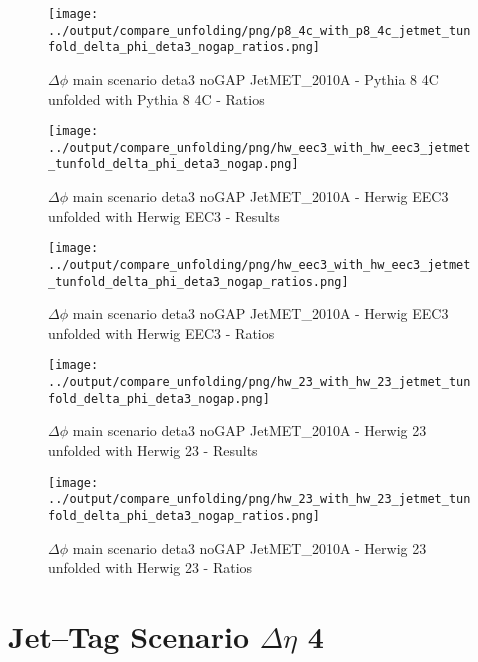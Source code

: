 \documentclass[11pt]{book}
\begin{document}
\begin{figure}[ht]
\centering
\texttt{[image: ../output/compare\_unfolding/png/p8\_4c\_with\_p8\_4c\_jetmet\_tunfold\_delta\_phi\_deta3\_nogap\_ratios.png]}
\caption{$\Delta\phi$ main scenario deta3 noGAP JetMET\_2010A - Pythia 8 4C unfolded with Pythia 8 4C - Ratios}
\label{p8_p8_jetmet_tunfold_delta_phi_deta3_nogap_b}
\end{figure}

\begin{figure}[ht]
\centering
\texttt{[image: ../output/compare\_unfolding/png/hw\_eec3\_with\_hw\_eec3\_jetmet\_tunfold\_delta\_phi\_deta3\_nogap.png]}
\caption{$\Delta\phi$ main scenario deta3 noGAP JetMET\_2010A - Herwig EEC3 unfolded with Herwig EEC3 - Results}
\label{hw_eec3_hw_eec3_jetmet_tunfold_delta_phi_deta3_nogap_a}
\end{figure}

\begin{figure}[ht]
\centering
\texttt{[image: ../output/compare\_unfolding/png/hw\_eec3\_with\_hw\_eec3\_jetmet\_tunfold\_delta\_phi\_deta3\_nogap\_ratios.png]}
\caption{$\Delta\phi$ main scenario deta3 noGAP JetMET\_2010A - Herwig EEC3 unfolded with Herwig EEC3 - Ratios}
\label{hw_eec3_hw_eec3_jetmet_tunfold_delta_phi_deta3_nogap_b}
\end{figure}

\begin{figure}[ht]
\centering
\texttt{[image: ../output/compare\_unfolding/png/hw\_23\_with\_hw\_23\_jetmet\_tunfold\_delta\_phi\_deta3\_nogap.png]}
\caption{$\Delta\phi$ main scenario deta3 noGAP JetMET\_2010A - Herwig 23 unfolded with Herwig 23 - Results}
\label{hw_23_hw_23_jetmet_tunfold_delta_phi_deta3_nogap_a}
\end{figure}

\begin{figure}[ht]
\centering
\texttt{[image: ../output/compare\_unfolding/png/hw\_23\_with\_hw\_23\_jetmet\_tunfold\_delta\_phi\_deta3\_nogap\_ratios.png]}
\caption{$\Delta\phi$ main scenario deta3 noGAP JetMET\_2010A - Herwig 23 unfolded with Herwig 23 - Ratios}
\label{hw_23_hw_23_jetmet_tunfold_delta_phi_deta3_nogap_b}
\end{figure}





\newpage
\chapter{Jet--Tag Scenario $\Delta\eta$ 4}
\end{document}
